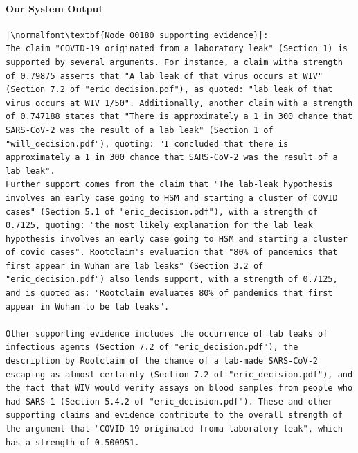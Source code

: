 \documentclass{article}
\begin{document}
\paragraph{Our System Output}
\begin{lstlisting}
|\normalfont\textbf{Node 00180 supporting evidence}|:
The claim "COVID-19 originated from a laboratory leak" (Section 1) is supported by several arguments. For instance, a claim witha strength of 0.79875 asserts that "A lab leak of that virus occurs at WIV" (Section 7.2 of "eric_decision.pdf"), as quoted: "lab leak of that virus occurs at WIV 1/50". Additionally, another claim with a strength of 0.747188 states that "There is approximately a 1 in 300 chance that SARS-CoV-2 was the result of a lab leak" (Section 1 of "will_decision.pdf"), quoting: "I concluded that there is approximately a 1 in 300 chance that SARS-CoV-2 was the result of a lab leak". 
Further support comes from the claim that "The lab-leak hypothesis involves an early case going to HSM and starting a cluster of COVID cases" (Section 5.1 of "eric_decision.pdf"), with a strength of 0.7125, quoting: "the most likely explanation for the lab leak hypothesis involves an early case going to HSM and starting a cluster of covid cases". Rootclaim's evaluation that "80% of pandemics that first appear in Wuhan are lab leaks" (Section 3.2 of "eric_decision.pdf") also lends support, with a strength of 0.7125, and is quoted as: "Rootclaim evaluates 80% of pandemics that first appear in Wuhan to be lab leaks".

Other supporting evidence includes the occurrence of lab leaks of infectious agents (Section 7.2 of "eric_decision.pdf"), the description by Rootclaim of the chance of a lab-made SARS-CoV-2 escaping as almost certainty (Section 7.2 of "eric_decision.pdf"), and the fact that WIV would verify assays on blood samples from people who had SARS-1 (Section 5.4.2 of "eric_decision.pdf"). These and other supporting claims and evidence contribute to the overall strength of the argument that "COVID-19 originated froma laboratory leak", which has a strength of 0.500951.


\end{lstlisting}
\end{document}
